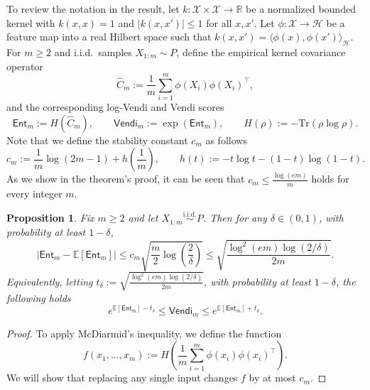 \documentclass{article}
\newtheorem{proposition}{Proposition}
\theoremstyle{plain}
\theoremstyle{definition}
\begin{document}
\begin{appendices}
To review the notation in the result, let $k:\mathcal{X}\times\mathcal{X}\to\mathbb{R}$ be a normalized bounded kernel with
$k(x,x)=1$ and $|k(x,x')|\le 1$ for all $x,x'$.
Let $\phi:\mathcal{X}\to\mathcal{H}$ be a feature map into a real Hilbert space such that
$k(x,x')=\langle \phi(x),\phi(x')\rangle_{\mathcal{H}}$.
For $m\ge 2$ and i.i.d.\ samples $X_{1:m}\sim P$, define the empirical kernel covariance operator
\[
\widehat{C}_m:=\frac{1}{m}\sum_{i=1}^m \phi(X_i)\phi(X_i)^\top,
\]
and the corresponding log-Vendi and Vendi scores
\[
\mathsf{Ent}_m := H(\widehat{C}_m),
\qquad
\mathsf{Vendi}_m := \exp(\mathsf{Ent}_m),
\qquad
H(\rho):=-\mathrm{Tr}(\rho\log\rho).
\]
Note that we define the stability constant $c_m$ as follows
\begin{equation}\label{eq:cm_def_app}
c_m := \frac{1}{m}\log(2m-1)+h\left(\frac{1}{m}\right),
\qquad
h(t):=-t\log t-(1-t)\log(1-t).
\end{equation}
As we show in the theorem's proof, it can be seen that $c_m\le \frac{\log(em)}{m}$ holds for every integer $m$.
\begin{proposition}
\label{prop:vendi_concentration_single_eval_app}
Fix $m\ge 2$ and let $X_{1:m}\overset{\mathrm{i.i.d.}}{\sim}P$.
Then for any $\delta\in(0,1)$, with probability at least $1-\delta$,
\begin{equation}\label{eq:ent_conc_app}
\big|\mathsf{Ent}_m-\mathbb{E}[\mathsf{Ent}_m]\big|
\le
c_m\sqrt{\frac{m}{2}\log\left(\frac{2}{\delta}\right)} \le \sqrt{\frac{\log^2(em)\log(2/\delta)}{2m}}.
\end{equation}
Equivalently, letting $t_\delta:=\sqrt{\frac{\log^2(em)\log(2/\delta)}{2m}}$, with probability at least $1-\delta$, the following holds
\begin{equation}\label{eq:vendi_mult_app}
e^{\mathbb{E}[\mathsf{Ent}_m]-t_\delta}
\le
\mathsf{Vendi}_m
\le
e^{\mathbb{E}[\mathsf{Ent}_m]+t_\delta}.
\end{equation}
\end{proposition}

\begin{proof}
To apply McDiarmid's inequality,
we define the function
\[
f(x_1,\ldots,x_m)
:=
H\left(\frac{1}{m}\sum_{i=1}^m \phi(x_i)\phi(x_i)^\top\right).
\]
We will show that replacing any single input changes $f$ by at most $c_m$.


\end{proof}
\end{appendices}
\end{document}
